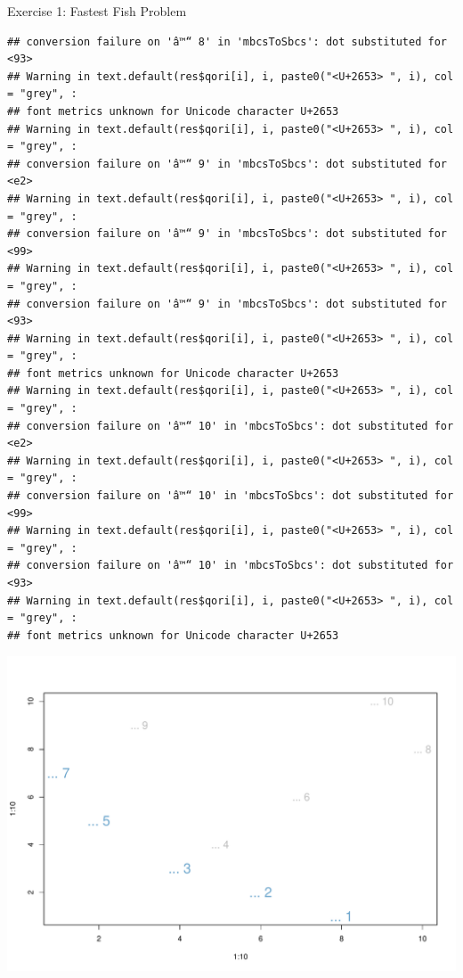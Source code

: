 \documentclass[
  10pt,
  ignorenonframetext,
  serif]{beamer}
\begin{document}
\begin{frame}[fragile]{Exercise 1: Fastest Fish Problem}
\begin{verbatim}
## conversion failure on 'â™“ 8' in 'mbcsToSbcs': dot substituted for <93>
## Warning in text.default(res$qori[i], i, paste0("<U+2653> ", i), col = "grey", :
## font metrics unknown for Unicode character U+2653
## Warning in text.default(res$qori[i], i, paste0("<U+2653> ", i), col = "grey", :
## conversion failure on 'â™“ 9' in 'mbcsToSbcs': dot substituted for <e2>
## Warning in text.default(res$qori[i], i, paste0("<U+2653> ", i), col = "grey", :
## conversion failure on 'â™“ 9' in 'mbcsToSbcs': dot substituted for <99>
## Warning in text.default(res$qori[i], i, paste0("<U+2653> ", i), col = "grey", :
## conversion failure on 'â™“ 9' in 'mbcsToSbcs': dot substituted for <93>
## Warning in text.default(res$qori[i], i, paste0("<U+2653> ", i), col = "grey", :
## font metrics unknown for Unicode character U+2653
## Warning in text.default(res$qori[i], i, paste0("<U+2653> ", i), col = "grey", :
## conversion failure on 'â™“ 10' in 'mbcsToSbcs': dot substituted for <e2>
## Warning in text.default(res$qori[i], i, paste0("<U+2653> ", i), col = "grey", :
## conversion failure on 'â™“ 10' in 'mbcsToSbcs': dot substituted for <99>
## Warning in text.default(res$qori[i], i, paste0("<U+2653> ", i), col = "grey", :
## conversion failure on 'â™“ 10' in 'mbcsToSbcs': dot substituted for <93>
## Warning in text.default(res$qori[i], i, paste0("<U+2653> ", i), col = "grey", :
## font metrics unknown for Unicode character U+2653
\end{verbatim}

\begin{center}\includegraphics{lec04_files/figure-beamer/unnamed-chunk-4-1} \end{center}
\end{frame}
\end{document}
